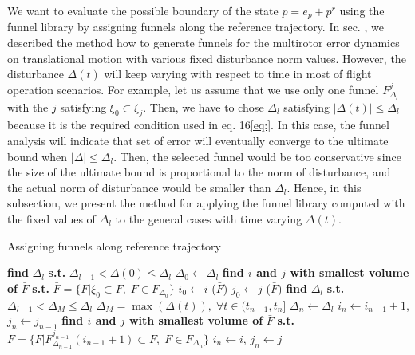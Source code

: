 \documentclass[letterpaper, 10 pt, conference]{ieeeconf}  %
\begin{document}
We want to evaluate the possible boundary of the state $p = e_p + p^r$ using the funnel library by assigning funnels along the reference trajectory. 
In sec. \label{sec:computingFunnel}, we described the method how to generate funnels for the multirotor error dynamics on translational motion with various fixed disturbance norm values.
However, the disturbance $\Delta(t)$ will keep varying with respect to time in most of flight operation scenarios.
For example, let us assume that we use only one funnel $F_{\Delta_l}^j$ with the $j$ satisfying $\xi_0 \subset \xi_j$. 
Then, we have to chose $\Delta_l$ satisfying $|\Delta(t)| \leq \Delta_l$ because it is the required condition used in eq. 16\eqref{eq:}.
In this case, the funnel analysis will indicate that set of error will eventually converge to the ultimate bound when $|\Delta| \leq \Delta_l$. Then, the selected funnel would be too conservative since the size of the ultimate bound is proportional to the norm of disturbance, and the actual norm of disturbance would be smaller than $\Delta_l$. 
Hence, in this subsection, we present the method for applying the funnel library computed with the fixed values of $\Delta_l$ to the general cases with time varying $\Delta(t)$. 
\begin{algorithm}[t]
  \caption{Assigning funnels along reference trajectory
    \label{alg:funnel}}
  \begin{algorithmic}[1]
    \Statex
	\State \textbf{find }$\Delta_{l}$\textbf{ s.t.} $\Delta_{l-1} < \Delta(0) \leq \Delta_l$
	\State $\Delta_{0} \gets \Delta_l$
	\State \textbf{find $i$ and $j$ with smallest volume of} $\bar{F}$  \textbf{s.t.}
	\State $\bar{F}=\{F|\xi_0 \subset F,\;F\in F_{\Delta_0}\}$
	\State $i_0 \gets i$ ($\bar{F}$)
	\State $j_0 \gets j$ ($\bar{F}$)
				\State \textbf{find }$\Delta_l$\textbf{ s.t. } $\Delta_{l-1} < \Delta_M \leq \Delta_l$
				\State {} $\Delta_M = \max(\Delta(t)),\;\forall t\in(t_{n-1},t_n]$
				\State $\Delta_{n} \gets \Delta_l$
				\State $i_n \gets i_{n-1}+1$, $j_n \gets j_{n-1}$
				\Else
				\State \textbf{find $i$ and $j$ with smallest volume of} $\bar{F}$ \textbf{s.t.}  
				\State $\bar{F}=\{F|F_{\Delta_{n-1}}^{j_{n-1}}(i_{n-1}+1) \subset {F},\;F \in F_{\Delta_n}\}$
				\State $i_n \gets i$, $j_n \gets j$
				\EndIf
      \EndFor
      \State {}
    \EndFunction
  \end{algorithmic}
\end{algorithm}
\end{document}
